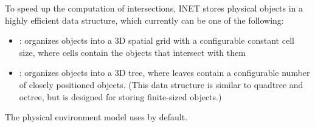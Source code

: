 To speed up the computation of intersections, INET stores physical objects
in a highly efficient data structure, which currently can be one of the
following:

\begin{itemize}
  \item {}: organizes objects into a 3D spatial grid with
    a configurable constant cell size, where cells contain the objects that
    intersect with them
  \item {}: organizes objects into a 3D tree, where
    leaves contain a configurable number of closely positioned objects.
    (This data structure is similar to quadtree and octree, but is designed for
    storing finite-sized objects.)
\end{itemize}

The physical environment model uses  by default.


